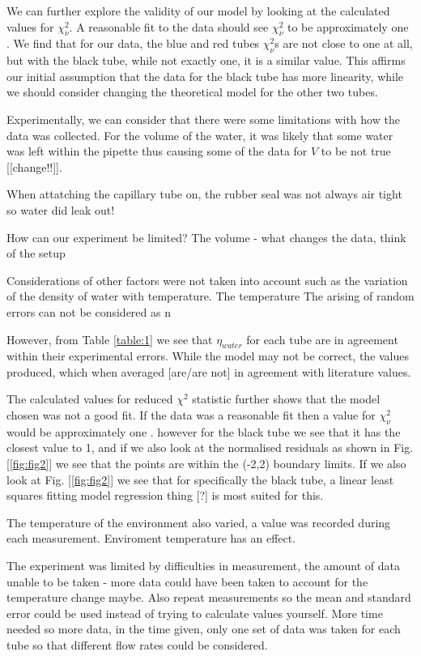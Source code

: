 \documentclass[twocolumn]{revtex4}
\begin{document}
We can further explore the validity of our model by looking at the calculated values for $\chi^2_{\nu}$. A reasonable fit to the data should see $\chi^2_{\nu}$ to be approximately one \cite{hughesandhayes}. We find that for our data, the blue and red tubes $\chi^2_{\nu}$s  are not close to one at all, but with the black tube, while not exactly one, it is a similar value. This affirms our initial assumption that the data for the black tube has more linearity, while we should consider changing the theoretical model for the other two tubes. 

Experimentally, we can consider that there were some limitations with how the data was collected. For the volume of the water, it was likely that some water was left within the pipette thus causing some of the data for $V$ to be not true [[change!!]]. 

When attatching the capillary tube on, the rubber seal was not always air tight so water did leak out! 

How can our experiment be limited? The volume - what changes the data, think of the setup  

Considerations of other factors were not taken into account such as the variation of the density of water with temperature. The temperature  The arising of random errors can not be considered as n

However, from Table \ref{table:1} we see that $\eta_{water}$ for each tube are in agreement within their experimental errors. While the model may not be correct, the values produced, which when averaged [are/are not] in agreement with literature values. 

The calculated values for reduced $\chi^2$ statistic further shows that the model chosen was not a good fit. If the data was a reasonable fit then a value for $\chi^2_{\nu}$ would be approximately one \cite{hughesandhayes}. however for the black tube we see that it has the closest value to 1, and if we also look at the normalised residuals as shown in Fig. [\ref{fig:fig2}] we see that the points are within the (-2,2) boundary limits. If we also look at Fig. [\ref{fig:fig2}] we see that for specifically the black tube, a linear least squares fitting model regression thing [?] is most suited for this.

The temperature of the environment also varied, a value was recorded during each measurement. Enviroment temperature has an effect. 

The experiment was limited by difficulties in measurement, the amount of data unable to be taken - more data could have been taken to account for the temperature change maybe. Also repeat measurements so the mean and standard error could be used instead of trying to calculate values yourself. More time needed so more data, in the time given, only one set of data was taken for each tube so that different flow rates could be considered. 
\end{document}
